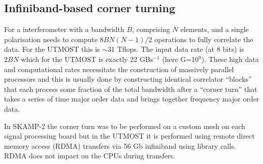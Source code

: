 \subsection{Infiniband-based corner turning}
For a interferometer with a bandwidth $B$, comprising $N$ elements, and a single polarisation needs to compute $8BN(N-1)/2$ operations to fully correlate the data. For the UTMOST this is $\sim$31 Tflops. The input data rate (at 8 bits) is $2BN$ which for the UTMOST is exactly 22 GBs$^{-1}$ (here G=10$^9$). These high data and computational rates necessitate the construction of massively parallel processors and this is usually done by constructing identical correlator ``blocks'' that each process some fraction of the total bandwidth after a ``corner turn'' that takes a series of time major order data and brings together frequency major order data.

In SKAMP-2 the corner turn was to be performed on a custom mesh on each signal processing board but in the UTMOST it is performed using remote direct memory access (RDMA) transfers via 56 Gb infiniband using library calls. RDMA does not impact on the CPUs during transfers.
